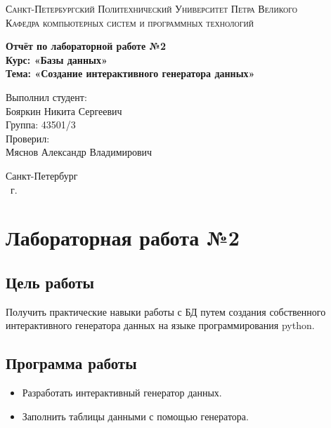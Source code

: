 \documentclass[14pt,a4paper,report]{report}
\begin{document}
\def\contentsname{Содержание}

\begin{titlepage}
	\begin{center}
		\textsc{Санкт-Петербургский Политехнический 
			Университет Петра Великого\\[5mm]
			Кафедра компьютерных систем и программных технологий}
		
		\vfill
		
		\textbf{Отчёт по лабораторной работе №2\\[3mm]
			Курс: «Базы данных»\\[3mm]
			Тема: «Создание интерактивного генератора данных»\\[35mm]
			}
	\end{center}
	
	\hfill
	\begin{minipage}{.5\textwidth}
		Выполнил студент:\\[2mm] 
		Бояркин Никита Сергеевич\\
		Группа: 43501/3\\[5mm]
		
		Проверил:\\[2mm] 
		Мяснов Александр Владимирович
	\end{minipage}
	\vfill
	\begin{center}
		Санкт-Петербург\\ \the\year\ г.
	\end{center}
\end{titlepage}

\tableofcontents
\clearpage

\chapter{Лабораторная работа №2}

\section{Цель работы}

Получить практические навыки работы с БД путем создания собственного интерактивного генератора данных на языке программирования python.

\section{Программа работы}

\begin{itemize}
	\item Разработать интерактивный генератор данных.
	\item Заполнить таблицы данными с помощью генератора.
\end{itemize}
\end{document}
